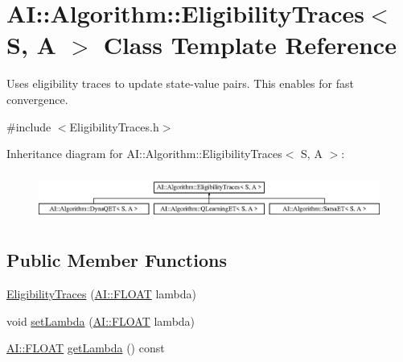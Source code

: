 \hypertarget{classAI_1_1Algorithm_1_1EligibilityTraces}{\section{A\+I\+:\+:Algorithm\+:\+:Eligibility\+Traces$<$ S, A $>$ Class Template Reference}
\label{classAI_1_1Algorithm_1_1EligibilityTraces}
}


Uses eligibility traces to update state-\/value pairs. This enables for fast convergence.  




{\ttfamily \#include $<$Eligibility\+Traces.\+h$>$}

Inheritance diagram for A\+I\+:\+:Algorithm\+:\+:Eligibility\+Traces$<$ S, A $>$\+:\begin{figure}[H]
\begin{center}
\leavevmode
\includegraphics[height=1.581921cm]{classAI_1_1Algorithm_1_1EligibilityTraces}
\end{center}
\end{figure}
\subsection*{Public Member Functions}
\begin{DoxyCompactItemize}
\item 
\hyperlink{classAI_1_1Algorithm_1_1EligibilityTraces_a5ee88e5ac3059733c38a95dba54f677d}{Eligibility\+Traces} (\hyperlink{namespaceAI_a41b74884a20833db653dded3918e05c3}{A\+I\+::\+F\+L\+O\+A\+T} lambda)
\item 
void \hyperlink{classAI_1_1Algorithm_1_1EligibilityTraces_ac52edaa0eeaf4446edb14f7b5415819f}{set\+Lambda} (\hyperlink{namespaceAI_a41b74884a20833db653dded3918e05c3}{A\+I\+::\+F\+L\+O\+A\+T} lambda)
\item 
\hyperlink{namespaceAI_a41b74884a20833db653dded3918e05c3}{A\+I\+::\+F\+L\+O\+A\+T} \hyperlink{classAI_1_1Algorithm_1_1EligibilityTraces_aea9a2c36874a3df328efdf4077ea1c19}{get\+Lambda} () const 
\end{DoxyCompactItemize}
